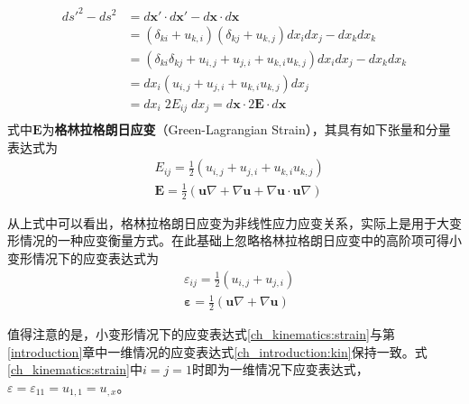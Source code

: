 \begin{equation}
\begin{split}
    ds'^2 - ds^2 &= d\boldsymbol x' \cdot d\boldsymbol x' - d\boldsymbol x \cdot d\boldsymbol x \\
                 &= (\delta_{ki} + u_{k,i})(\delta_{kj} + u_{k,j}) dx_i dx_j - dx_k dx_k \\
                 &= (\delta_{ki}\delta_{kj} + u_{i,j} + u_{j,i} + u_{k,i}u_{k,j}) dx_i dx_j - dx_k dx_k \\
                 &= dx_i (u_{i,j} + u_{j,i} + u_{k,i}u_{k,j}) dx_j \\
                 &= dx_i \; 2E_{ij} \; dx_j
                  = d\boldsymbol x \cdot 2\boldsymbol E \cdot d\boldsymbol x \\
\end{split}
\end{equation}
式中$\boldsymbol E$为\textbf{格林拉格朗日应变}（Green-Lagrangian Strain），其具有如下张量和分量表达式为
\begin{subequations}
\begin{align}
    &E_{ij} = \frac{1}{2}(u_{i,j} + u_{j,i} + u_{k,i}u_{k,j}) \\
    &\boldsymbol E = \frac{1}{2}(\boldsymbol u \nabla + \nabla \boldsymbol u + \nabla \boldsymbol u \cdot \boldsymbol u \nabla)
\end{align}
\end{subequations} \par
从上式中可以看出，格林拉格朗日应变为非线性应力应变关系，实际上是用于大变形情况的一种应变衡量方式。在此基础上忽略格林拉格朗日应变中的高阶项可得小变形情况下的应变表达式为
\begin{subequations}\label{ch_kinematics:strain}
\begin{align}
&\varepsilon_{ij} = \frac{1}{2}(u_{i,j}+u_{j,i}) \\
&\boldsymbol \varepsilon = \frac{1}{2}(\boldsymbol u \nabla + \nabla \boldsymbol u)
\end{align}
\end{subequations}\par
值得注意的是，小变形情况下的应变表达式\eqref{ch_kinematics:strain}与第\ref{introduction}章中一维情况的应变表达式\eqref{ch_introduction:kin}保持一致。式\eqref{ch_kinematics:strain}中$i=j=1$时即为一维情况下应变表达式，$\varepsilon=\varepsilon_{11} = u_{1,1} = u_{,x}$。

